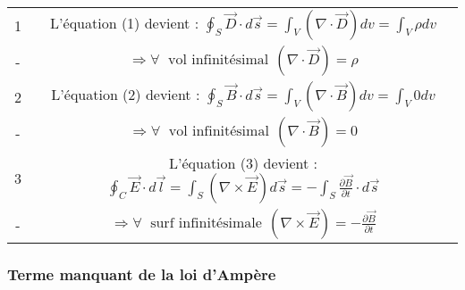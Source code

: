 \documentclass[a4paper,12pt]{article}
\begin{document}
\begin{center}

\begin{tabular}{|c|c|}

\hline

1 & L'équation (1) devient : $ \oint_{S} \vec{D} \cdot d\vec{s}  =  \int_{V} (\nabla \cdot \vec{D} ) dv =  \int_{V} \rho dv$ \\  
- & $\Rightarrow \forall  \hspace{3pt} \mbox{ vol infinitésimal} \hspace{5pt} (\nabla \cdot \vec{D} ) = \rho$  \\

\hline

2 & L'équation (2) devient : $ \oint_{S} \vec{B} \cdot d\vec{s}  =  \int_{V} (\nabla \cdot \vec{B} ) dv =  \int_{V} 0 dv$ \\ 
- & $\Rightarrow \forall  \hspace{3pt} \mbox{ vol infinitésimal} \hspace{5pt} (\nabla \cdot \vec{B} ) = 0 $ \\

\hline

3 & L'équation (3) devient : $   \oint_{C} \vec{E} \cdot d\vec{l} = \int_{S} (\nabla \times \vec{E}) d\vec{s}= -\int_{S} \frac{\partial \vec{B}}{\partial t} \cdot d\vec{s}$ \\  
- &$ \Rightarrow \forall  \hspace{3pt} \mbox{ surf infinitésimale} \hspace{5pt} (\nabla \times \vec{E} ) = -\frac{\partial \vec{B}}{\partial t}$\\

\hline

\end{tabular}

\end{center}

\subsubsection{Terme manquant de la loi d'Ampère}
\end{document}
